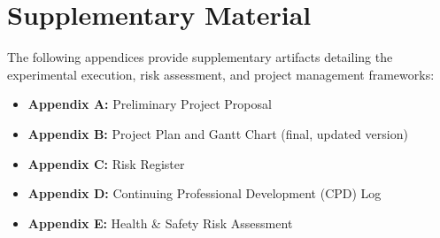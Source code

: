 \documentclass[12pt, a4paper]{article}
\begin{document}
\newpage
\section*{Supplementary Material}

The following appendices provide supplementary artifacts detailing the experimental execution, risk assessment, and project management frameworks:

\begin{itemize}
    \item \textbf{Appendix A:} Preliminary Project Proposal
    \item \textbf{Appendix B:} Project Plan and Gantt Chart (final, updated version)
    \item \textbf{Appendix C:} Risk Register
    \item \textbf{Appendix D:} Continuing Professional Development (CPD) Log
    \item \textbf{Appendix E:} Health \& Safety Risk Assessment
\end{itemize}
\end{document}
